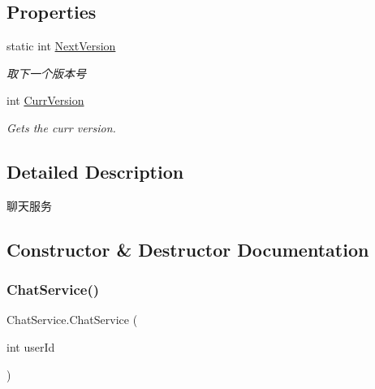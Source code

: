 \subsection*{Properties}
\begin{DoxyCompactItemize}
\item 
static int \mbox{\hyperlink{class_chat_service_abe3bd1117695ea56843642519c995a5a}{Next\+Version}}
\begin{DoxyCompactList}\small\item\em 取下一个版本号 \end{DoxyCompactList}\item 
int \mbox{\hyperlink{class_chat_service_a1a35e337d470e0a1c4627b778c9f93cd}{Curr\+Version}}
\begin{DoxyCompactList}\small\item\em Gets the curr version. \end{DoxyCompactList}\end{DoxyCompactItemize}


\subsection{Detailed Description}
聊天服务 



\subsection{Constructor \& Destructor Documentation}
\mbox{\label{class_chat_service_a12dc266664c0a263013841e75dc949fa}} 
\subsubsection{\texorpdfstring{Chat\+Service()}{ChatService()}}
{\footnotesize\ttfamily Chat\+Service.\+Chat\+Service (\begin{DoxyParamCaption}\item[{int}]{user\+Id }\end{DoxyParamCaption})\hspace{0.3cm}{\ttfamily [protected]}}



